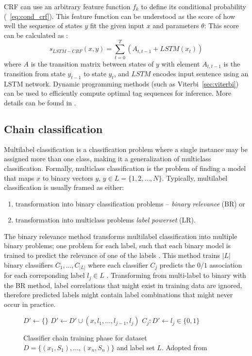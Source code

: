 CRF can use an arbitrary feature function $f_k$
to define its conditional probability (~\ref{eq:cond_crf}).
This feature function can 
be understood as the score of how well the sequence 
of states $y$ fit the given input $x$ and parameters $\theta$:
This score can be calculated as
:
$$
s_{LSTM-CRF}(x, y) = \sum_{t=0}^{T} \left( A_{t, t-1} + LSTM(x_t) \right)
$$
where $A$ is the transition matrix between states of $y$ with element
$A_{t, t-1}$ is the transition from state $y_{t-1}$ to state $y_{t}$, and $LSTM$
encodes input sentence using an LSTM network.
Dynamic programming methods (such as Viterbi~\ref{sec:viterbi}) can be used 
to efficiently compute optimal tag sequences
for inference. More details can be found in \citep{huang2015bidirectional}.

\subsection{Chain classification}
\label{sec:chain_classification}

Multilabel classification is a classification problem where 
a single instance may be assigned more than one class, making it 
a generalization of multiclass classification.
Formally, multiclass classification is the problem of finding 
a model that maps $x$ to binary vectors $y$, $y \in L = \{1, 2, \dots, N\}$. Typically, 
multilabel classification is usually framed as either:
\begin{enumerate}
	\item transformation into binary classification problems -- \textit{binary relevance} (BR) \citep{luaces2012binary} or
	\item transformation into multiclass problems \textit{label powerset} (LR).
\end{enumerate}
The binary relevance method transforms multilabel classification
into multiple binary problems; one problem for each label, such that each
binary model is trained to predict the relevance of one of the labels
\citep{read2011classifier}. This method trains $|L|$ binary classifiers
$C_1, \dots, C_{|L|}$ where each classifier $C_j$ predicts the $0/1$ association
for each correponding label $l_j \in L$ \citep{read2011classifier}.
Transforming from multi-label to binary with the BR method,
label correlations that might exist in training data are ignored, therefore
predicted labels might contain label combinations that might never occur in practice. 

\begin{figure}
\begin{algorithmic}[1]
  \State $D' \gets \{\}$
	  \State $D' \gets D' \cup (x, l_1, \dots, l_{j - 1}, l_j)$
	  \State $C_j: D' \gets l_j \in \{0, 1\}$
	\EndFor
\EndFor
\end{algorithmic}
\caption{Classifier chain training phase for dataset 
	$D = \{(x_1, S_1), \dots, (x_n, S_n)\}$
	and label set $L$.
	Adopted from~\citep{read2011classifier}
	}

\label{alg:train_chain_classifier}
\end{figure}

